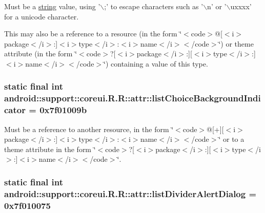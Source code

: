 Must be a \hyperlink{classandroid_1_1support_1_1coreui_1_1_r_1_1string}{string} value, using '$\backslash$;' to escape characters such as '$\backslash$n' or '$\backslash$uxxxx' for a unicode character. 

This may also be a reference to a resource (in the form \char`\"{}$<$code$>$@\mbox{[}$<$i$>$package$<$/i$>$:\mbox{]}$<$i$>$type$<$/i$>$:$<$i$>$name$<$/i$>$$<$/code$>$\char`\"{}) or theme attribute (in the form \char`\"{}$<$code$>$?\mbox{[}$<$i$>$package$<$/i$>$:\mbox{]}\mbox{[}$<$i$>$type$<$/i$>$:\mbox{]}$<$i$>$name$<$/i$>$$<$/code$>$\char`\"{}) containing a value of this type. \hypertarget{classandroid_1_1support_1_1coreui_1_1_r_1_1attr_7c96482b84472d6e27bd61775bb48ac5}{
\subsubsection[{listChoiceBackgroundIndicator}]{\setlength{\rightskip}{0pt plus 5cm}static final int android::support::coreui.R.R::attr::listChoiceBackgroundIndicator = 0x7f01009b}}
\label{classandroid_1_1support_1_1coreui_1_1_r_1_1attr_7c96482b84472d6e27bd61775bb48ac5}


Must be a reference to another resource, in the form \char`\"{}$<$code$>$@\mbox{[}+\mbox{]}\mbox{[}$<$i$>$package$<$/i$>$:\mbox{]}$<$i$>$type$<$/i$>$:$<$i$>$name$<$/i$>$$<$/code$>$\char`\"{} or to a theme attribute in the form \char`\"{}$<$code$>$?\mbox{[}$<$i$>$package$<$/i$>$:\mbox{]}\mbox{[}$<$i$>$type$<$/i$>$:\mbox{]}$<$i$>$name$<$/i$>$$<$/code$>$\char`\"{}. \hypertarget{classandroid_1_1support_1_1coreui_1_1_r_1_1attr_ec1341e18d917292a2afb5a178652822}{
\subsubsection[{listDividerAlertDialog}]{\setlength{\rightskip}{0pt plus 5cm}static final int android::support::coreui.R.R::attr::listDividerAlertDialog = 0x7f010075}}
\label{classandroid_1_1support_1_1coreui_1_1_r_1_1attr_ec1341e18d917292a2afb5a178652822}


